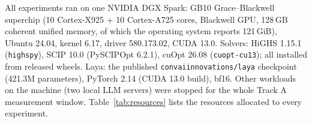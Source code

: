 {\sloppy All experiments ran on one NVIDIA DGX Spark: GB10 Grace--Blackwell superchip (10 Cortex-X925 + 10 Cortex-A725
cores, Blackwell GPU, 128\,GB coherent unified memory, of which the operating system reports 121\,GiB), Ubuntu 24.04, kernel 6.17, driver 580.173.02, CUDA 13.0.
Solvers: HiGHS 1.15.1 (\texttt{highspy}), SCIP 10.0 (PySCIPOpt 6.2.1), cuOpt 26.08 (\texttt{cuopt-cu13}); all
installed from released wheels. Laya: the published \texttt{convaiinnovations/}\allowbreak\texttt{laya} checkpoint (421.3M
parameters), PyTorch 2.14 (CUDA 13.0 build), bf16. Other workloads on the machine (two local LLM servers) were
stopped for the whole Track A measurement window. Table~\ref{tab:resources} lists the resources allocated to
every experiment.\par}

